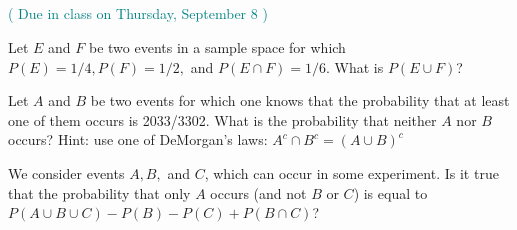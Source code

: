 \documentclass[12pt]{article}
\newenvironment{question}[2][Question]{\begin{trivlist}
\item[\hskip \labelsep {\bfseries #1}\hskip \labelsep {\bfseries #2.}]}{\end{trivlist}}
\begin{document}
\subsection*{}
\centering\textcolor{teal}{( Due in class on Thursday, September 8 )}
\vspace{5mm}


 \begin{question}{1} Let $E$ and $F$ be two events in a sample space for which $P(E) = 1/4, P(F) = 1/2,$ and $P(E \cap F) = 1/6$. What is $P(E \cup F)$? 
\end{question} 

\vspace{5mm}


 \begin{question}{2} Let $A$ and $B$ be two events for which one knows that the probability that at least one of them occurs is 2033/3302. What is the probability that neither $A$ nor $B$ occurs? Hint: use one of DeMorgan's  laws: $A^c \cap B^c = (A \cup B)^c$ 
\end{question} 


\vspace{5mm}

 
   \begin{question}{3} We consider events $A, B,$ and $C$, which can occur in some experiment.
Is it true that the probability that only $A$ occurs (and not $B$ or $C$) is equal to 
$P(A \cup B \cup C) - P(B) - P(C) + P(B \cap C)$?
\end{question} 

\vspace{5mm}
\end{document}
